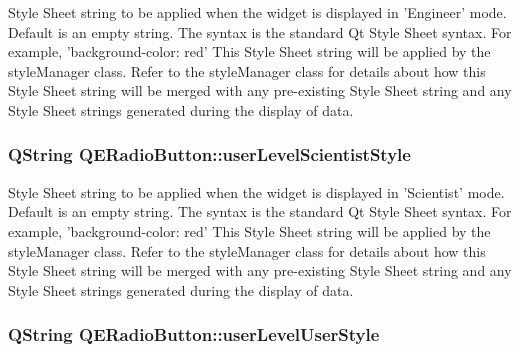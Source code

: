 \label{classQERadioButton_a6e05c0168077b53a67ef237eb5af1939}
Style Sheet string to be applied when the widget is displayed in 'Engineer' mode. Default is an empty string. The syntax is the standard Qt Style Sheet syntax. For example, 'background-\/color: red' This Style Sheet string will be applied by the styleManager class. Refer to the styleManager class for details about how this Style Sheet string will be merged with any pre-\/existing Style Sheet string and any Style Sheet strings generated during the display of data. \hypertarget{classQERadioButton_a1cc5aaa79764da34d130c4a7a8a1e2df}{
\subsubsection[{userLevelScientistStyle}]{\setlength{\rightskip}{0pt plus 5cm}QString QERadioButton::userLevelScientistStyle}}
\label{classQERadioButton_a1cc5aaa79764da34d130c4a7a8a1e2df}
Style Sheet string to be applied when the widget is displayed in 'Scientist' mode. Default is an empty string. The syntax is the standard Qt Style Sheet syntax. For example, 'background-\/color: red' This Style Sheet string will be applied by the styleManager class. Refer to the styleManager class for details about how this Style Sheet string will be merged with any pre-\/existing Style Sheet string and any Style Sheet strings generated during the display of data. \hypertarget{classQERadioButton_a89be5341593c73dd2b2dadfa2daf587e}{
\subsubsection[{userLevelUserStyle}]{\setlength{\rightskip}{0pt plus 5cm}QString QERadioButton::userLevelUserStyle}}
\label{classQERadioButton_a89be5341593c73dd2b2dadfa2daf587e}
